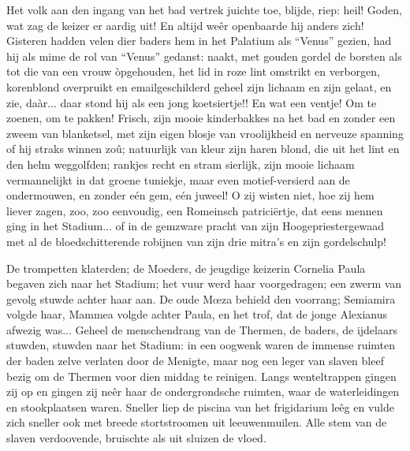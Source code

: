 \documentclass[a4paper, 12pt, oneside, dutch]{article}
\begin{document}
Het volk aan den ingang van het bad vertrek juichte toe, blijde, riep: heil! Goden, wat zag de keizer er aardig uit! En altijd weêr openbaarde hij anders zich! Gisteren hadden velen dier baders hem in het Palatium als "`Venus"' gezien, had hij als mime de rol van "`Venus"' gedanst: naakt, met gouden gordel de borsten als tot die van een vrouw òpgehouden, het lid in roze lint omstrikt en verborgen, korenblond overpruikt en emailgeschilderd geheel zijn lichaam en zijn gelaat, en zie, daàr... daar stond hij als een jong koetsiertje!! En wat een ventje! Om te zoenen, om te pakken! Frisch, zijn mooie kinderbakkes na het bad en zonder een zweem van blanketsel, met zijn eigen blosje van vroolijkheid en nerveuze spanning of hij straks winnen zoû; natuurlijk van kleur zijn haren blond, die uit het lint en den helm weggolfden; rankjes recht en stram sierlijk, zijn mooie lichaam vermannelijkt in dat groene tuniekje, maar even motief-versierd aan de ondermouwen, en zonder eén gem, eén juweel! O zij wisten niet, hoe zij hem liever zagen, zoo, zoo eenvoudig, een Romeinsch patriciërtje, dat eens mennen ging in het Stadium... of in de gemzware pracht van zijn Hoogepriestergewaad met al de bloedschitterende robijnen van zijn drie mitra's en zijn gordelschulp!

De trompetten klaterden; de Moeders, de jeugdige keizerin Cornelia Paula begaven zich naar het Stadium; het vuur werd haar voorgedragen; een zwerm van gevolg stuwde achter haar aan. De oude Mœza behield den voorrang; Semiamira volgde haar, Mammea volgde achter Paula, en het trof, dat de jonge Alexianus afwezig was... Geheel de menschendrang van de Thermen, de baders, de ijdelaars stuwden, stuwden naar het Stadium: in een oogwenk waren de immense ruimten der baden zelve verlaten door de Menigte, maar nog een leger van slaven bleef bezig om de Thermen voor dien middag te reinigen. Langs wenteltrappen gingen zij op en gingen zij neêr haar de ondergrondsche ruimten, waar de waterleidingen en stookplaatsen waren. Sneller liep de piscina van het frigidarium leêg en vulde zich sneller ook met breede stortstroomen uit leeuwenmuilen. Alle stem van de slaven verdoovende, bruischte als uit sluizen de vloed.
\end{document}
